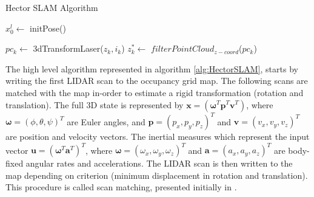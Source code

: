 \begin{algorithm}[H]
\caption{Hector SLAM Algorithm}
	   {\(x_{0}^{l} \gets\) initPose()\;}%
	 
	    {
	  	\(pc_k \gets\) 3dTransformLaser(\(z_k,i_k\)) \;
	  	\(z_k^* \gets\) $filterPointCloud_{z-coord}$(\(pc_k\))\;
	  	
  		}%
  	\label{alg:HectorSLAM}
\end{algorithm}

The high level algorithm represented in algorithm \ref{alg:HectorSLAM}, starts by writing the first LIDAR scan to the occupancy grid map. The following scans are matched with the map in-order to estimate a rigid transformation (rotation and translation). The full 3D state is represented by $\mathbf{x} = (\boldsymbol{\omega}^T \mathbf{p}^T \mathbf{v}^T)$, where $\boldsymbol{\omega} = (\phi, \theta, \psi)^T$ are Euler angles, and $\mathbf{p} = (p_x, p_y, p_z)^T$ and $\mathbf{v} = (v_x, v_y, v_z)^T$ are position and velocity vectors. The inertial measures which represent the input vector $\mathbf{u} = (\boldsymbol{\omega}^T \mathbf{a}^T)^T$, where $\boldsymbol{\omega} = (\omega_x, \omega_y, \omega_z)^T$ and $\mathbf{a} = (a_x, a_y, a_z)^T$ are body-fixed angular rates and accelerations. The LIDAR scan is then written to the map depending on criterion (minimum displacement in rotation and translation). This procedure is called scan matching, presented initially in \cite{Lucas1981}. 


